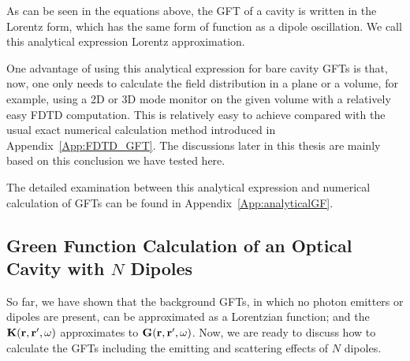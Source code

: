 As can be seen in the equations above, the GFT of a cavity is written in the Lorentz form, which has the same form of function as a dipole oscillation. We call this analytical expression Lorentz approximation.

One advantage of using this analytical expression for bare cavity GFTs is that, now, one only needs to calculate the field distribution in a plane or a volume, for example, using a 2D or 3D mode monitor on the given volume with a relatively easy FDTD computation. This is relatively easy to achieve compared with the usual exact numerical calculation method introduced in Appendix~\ref{App:FDTD_GFT}. The discussions later in this thesis are mainly based on this conclusion we have tested here.

The detailed examination between this analytical expression and numerical calculation of GFTs can be found in Appendix~\ref{App:analyticalGF}.





\subsection{Green Function Calculation of an Optical Cavity with $N$ Dipoles}\label{section:GN}
So far, we have shown that the background GFTs, in which no photon emitters or dipoles are present, can be approximated as a Lorentzian function; and the $\mathbf{K}(\mathbf{r},\mathbf{r}',\omega)$ approximates to $\mathbf{G}(\mathbf{r},\mathbf{r}',\omega)$. Now, we are ready to discuss how to calculate the GFTs including the emitting and scattering effects of $N$ dipoles.

